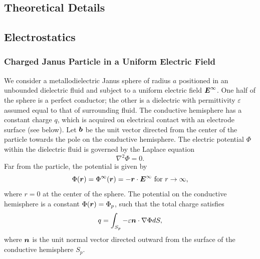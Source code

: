 \begin{appendices}

\section{Theoretical Details}

\subsection{Electrostatics}

\subsubsection{Charged Janus Particle in a Uniform Electric Field}
\label{sec:unbounded}

We consider a metallodielectric Janus sphere of radius $a$ positioned in an unbounded dielectric fluid and subject to a uniform electric field $\boldsymbol{E}^{\infty}$.
One half of the sphere is a perfect conductor; the other is a dielectric with permittivity $\varepsilon$ assumed equal to that of surrounding fluid. 
The conductive hemisphere has a constant charge $q$, which is acquired on electrical contact with an electrode surface (see below).
Let $\boldsymbol{b}$ be the unit vector directed from the center of the particle towards the pole on the conductive hemisphere.
The electric potential $\Phi$ within the dielectric fluid is governed by the Laplace equation
\begin{equation}
    \nabla^2\Phi = 0. \label{eq:laplace}
\end{equation}
Far from the particle, the potential is given by
\begin{equation}
    \Phi(\boldsymbol{r}) = \Phi^{\infty}(\boldsymbol{r}) = -\boldsymbol{r}\cdot\boldsymbol{E}^{\infty} \text{ for } r\rightarrow\infty,
\end{equation}
where $r=0$ at the center of the sphere.
The potential on the conductive hemisphere is a constant $\Phi(\boldsymbol{r})=\Phi_p$, such that the total charge satisfies 
\begin{equation}
    q = \int_{S_p} -\varepsilon \boldsymbol{n}\cdot\nabla\Phi dS,\label{eq:charge}
\end{equation}
where $\boldsymbol{n}$ is the unit normal vector directed outward from the surface of the conductive hemisphere $S_p$.


\end{appendices}
